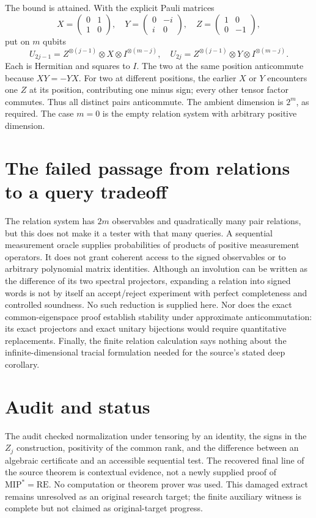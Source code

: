 \documentclass[11pt]{article}
\begin{document}
The bound is attained. With the explicit Pauli matrices
\[
 X=\begin{pmatrix}0&1\\1&0\end{pmatrix},\quad
 Y=\begin{pmatrix}0&-i\\i&0\end{pmatrix},\quad
 Z=\begin{pmatrix}1&0\\0&-1\end{pmatrix},
\]
put on $m$ qubits
\[
 U_{2j-1}=Z^{\otimes(j-1)}\otimes X\otimes I^{\otimes(m-j)},
 \quad
 U_{2j}=Z^{\otimes(j-1)}\otimes Y\otimes I^{\otimes(m-j)}.
\]
Each is Hermitian and squares to $I$. The two at the same
position anticommute because $XY=-YX$. For two at different
positions, the earlier $X$ or $Y$ encounters one $Z$ at its
position, contributing one minus sign; every other tensor factor
commutes. Thus all distinct pairs anticommute. The ambient
dimension is $2^m$, as required. The case $m=0$ is the empty
relation system with arbitrary positive dimension.

\section{The failed passage from relations to a query tradeoff}
The relation system has $2m$ observables and quadratically many
pair relations, but this does not make it a tester with that many
queries. A sequential measurement oracle supplies probabilities
of products of positive measurement operators. It does not grant
coherent access to the signed observables or to arbitrary
polynomial matrix identities. Although an involution can be
written as the difference of its two spectral projectors,
expanding a relation into signed words is not by itself an
accept/reject experiment with perfect completeness and controlled
soundness. No such reduction is supplied here.
Nor does the exact common-eigenspace proof establish stability
under approximate anticommutation: its exact projectors and
exact unitary bijections would require quantitative replacements.
Finally, the finite relation calculation says nothing about the
infinite-dimensional tracial formulation needed for the source's
stated deep corollary.

\section{Audit and status}
The audit checked normalization under tensoring by an identity,
the signs in the $Z_j$ construction, positivity of the common
rank, and the difference between an algebraic certificate and
an accessible sequential test. The recovered final line of the
source theorem is contextual evidence, not a newly supplied proof
of $\mathrm{MIP}^*=\mathrm{RE}$. No computation or theorem prover
was used. This damaged extract remains unresolved as an original
research target; the finite auxiliary witness is complete but
not claimed as original-target progress.
\end{document}
